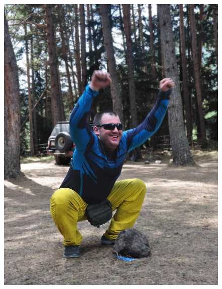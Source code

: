 \begin{figure}[h!]
	\centering
	\begin{minipage}[h]{0.30\linewidth}
		\includegraphics[width=\linewidth]{../pics/DSC_1150.jpg}
	\end{minipage}
	\quad
	\begin{minipage}[h]{0.30\linewidth}

\end{minipage}
\end{figure}
